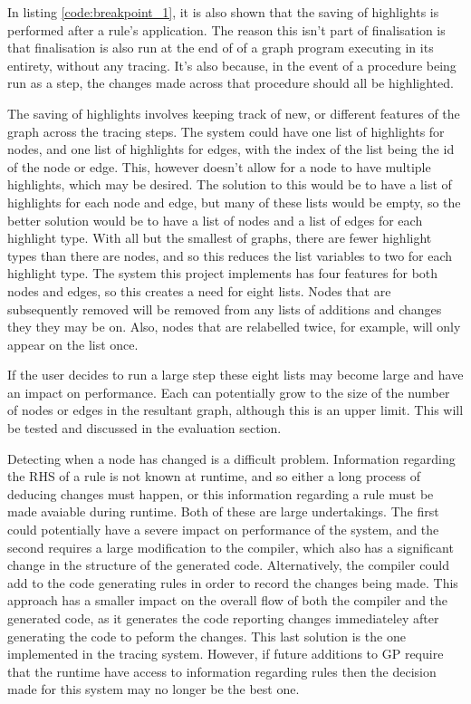 \documentclass{UoYCSproject}
\begin{document}
In listing \ref{code:breakpoint_1}, it is also shown that the saving of highlights is performed after a rule's application. The reason this isn't part of finalisation is that finalisation is also run at the end of of a graph program executing in its entirety, without any tracing. It's also because, in the event of a procedure being run as a step, the changes made across that procedure should all be highlighted.

The saving of highlights involves keeping track of new, or different features of the graph across the tracing steps. The system could have one list of highlights for nodes, and one list of highlights for edges, with the index of the list being the id of the node or edge. This, however doesn't allow for a node to have multiple highlights, which may be desired. The solution to this would be to have a list of highlights for each node and edge, but many of these lists would be empty, so the better solution would be to have a list of nodes and a list of edges for each highlight type. With all but the smallest of graphs, there are fewer highlight types than there are nodes, and so this reduces the list variables to two for each highlight type. The system this project implements has four features for both nodes and edges, so this creates a need for eight lists. Nodes that are subsequently removed will be removed from any lists of additions and changes they they may be on. Also, nodes that are relabelled twice, for example, will only appear on the list once.

If the user decides to run a large step these eight lists may become large and have an impact on performance. Each can potentially grow to the size of the number of nodes or edges in the resultant graph, although this is an upper limit. This will be tested and discussed in the evaluation section.

Detecting when a node has changed is a difficult problem. Information regarding the RHS of a rule is not known at runtime, and so either a long process of deducing changes must happen, or this information regarding a rule must be made avaiable during runtime. Both of these are large undertakings. The first could potentially have a severe impact on performance of the system, and the second requires a large modification to the compiler, which also has a significant change in the structure of the generated code. Alternatively, the compiler could add to the code generating rules in order to record the changes being made. This approach has a smaller impact on the overall flow of both the compiler and the generated code, as it generates the code reporting changes immediateley after generating the code to peform the changes. This last solution is the one implemented in the tracing system. However, if future additions to GP require that the runtime have access to information regarding rules then the decision made for this system may no longer be the best one.
\end{document}
